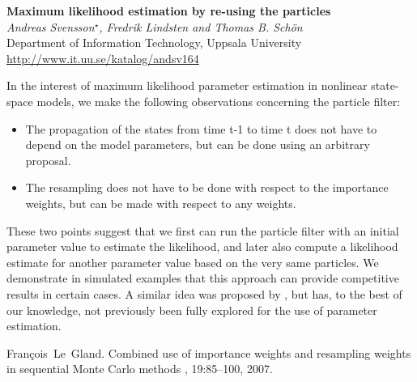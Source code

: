 \documentclass[12pt]{article}
\newcommand{\postertitle}[1]{{\Large\bf #1}\\[12pt]}
\newcommand{\authors}[1]{\emph{#1}\\}
\newcommand{\affiliations}[1]{{#1}\\}
\newcommand{\contacts}[1]{{#1}}
\begin{document}
\begin{center}
\vspace*{0.5cm}
%
\postertitle{Maximum likelihood estimation by re-using the particles}
%
\authors{Andreas Svensson$^\star$, Fredrik Lindsten and Thomas B. Sch\"on} %
% 
\affiliations{Department of Information Technology, Uppsala University}
%
\contacts{\url{http://www.it.uu.se/katalog/andsv164}} %
%
\vspace*{0.3cm}
\end{center}

In the interest of maximum likelihood parameter estimation in nonlinear state-space models, we make the following observations concerning the particle filter:
\begin{itemize}
	\item The propagation of the states from time t-1 to time t does not have to depend on the model parameters, but can be done using an arbitrary proposal.
	\item The resampling does not have to be done with respect to the importance weights, but can be made with respect to any weights.
\end{itemize}
These two points suggest that we first can run the particle filter with an initial parameter value to estimate the likelihood, and later also compute a likelihood estimate for another parameter value based on the very same particles. We demonstrate in simulated examples that this approach can provide competitive results in certain cases. A similar idea was proposed by \cite{label}, but has, to the best of our knowledge, not previously been fully explored for the use of parameter estimation.


\begin{thebibliography}{1}	
	Fran\c{c}ois~Le~Gland.
	\newblock Combined use of importance weights and resampling weights in sequential Monte Carlo methods
	, 19:85--100, 2007.	
\end{thebibliography}
\end{document}
